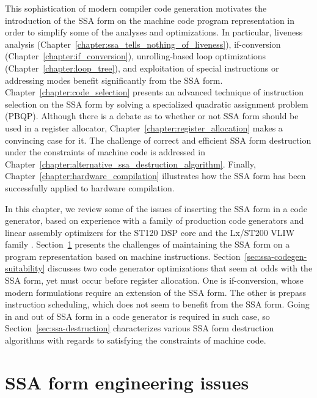 This sophistication of modern compiler code generation motivates the
introduction of the SSA form on the machine code program representation in
order to simplify some of the analyses and optimizations. In particular,
liveness analysis (Chapter~\ref{chapter:ssa_tells_nothing_of_liveness}),
if-conversion (Chapter~\ref{chapter:if_conversion}), unrolling-based loop
optimizations (Chapter~\ref{chapter:loop_tree}), and exploitation of special
instructions or addressing modes benefit significantly from the SSA form.
Chapter~\ref{chapter:code_selection} presents an advanced technique of
instruction selection on the SSA form by solving a specialized quadratic
assignment problem (PBQP). Although there is a debate as to whether or not SSA
form should be used in a register allocator,
Chapter~\ref{chapter:register_allocation} makes a convincing case for it. The
challenge of correct and efficient SSA form destruction under the constraints
of machine code is addressed in
Chapter~\ref{chapter:alternative_ssa_destruction_algorithm}. Finally,
Chapter~\ref{chapter:hardware_compilation} illustrates how the SSA form has been successfully
applied to hardware compilation.

In this chapter, we review some of the issues of inserting the SSA form in a code
generator, based on experience with a family of production code generators and linear
assembly optimizers for the ST120 DSP core \cite{Dinechin:2000:ME}
\cite{Dinechin:2000:CASES,Stoutchinin:2001:MICRO,Rastello:2004:CGO} and the
Lx/ST200 VLIW family \cite{Faraboschi:2000:ISCA}
\cite{Dinechin:2007:MISTA,Dinechin:2008:EuroPar,Boissinot:2008:CGO,Boissinot:2009:CGO,Boissinot:2011:APLAS}.
Section~\ref{sec:ssa-codegen-engineering} presents the challenges of maintaining
the SSA form on a program representation based on machine instructions.
Section~\ref{sec:ssa-codegen-suitability} discusses two code generator
optimizations that seem at odds with the SSA form, yet must occur before register
allocation. One is if-conversion, whose modern formulations require an extension
of the SSA form. The other is prepass instruction scheduling, which
does not seem to benefit from the SSA form.  Going in and out of SSA form in a
code generator is required in such case, so Section~\ref{sec:ssa-destruction}
characterizes various SSA form destruction algorithms with regards to satisfying
the constraints of machine code.


\section{SSA form engineering issues}
\label{sec:ssa-codegen-engineering}

